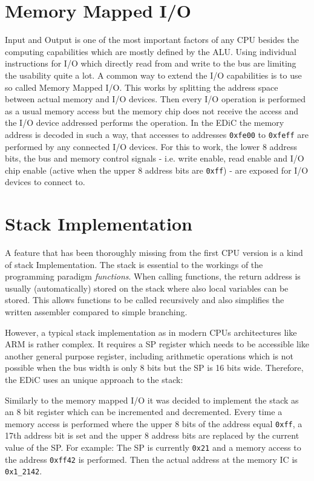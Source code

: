\section{Memory Mapped I/O}
Input and Output is one of the most important factors of any \gls{CPU} besides the computing capabilities which are mostly defined by the \gls{ALU}.
Using individual instructions for I/O which directly read from and write to the bus are limiting the usability quite a lot.
A common way to extend the I/O capabilities is to use so called Memory Mapped I/O.
This works by splitting the address space between actual memory and I/O devices.
Then every I/O operation is performed as a usual memory access but the memory chip does not receive the access and the I/O device addressed performs the operation.
In the \gls{EDiC} the memory address is decoded in such a way, that accesses to addresses \texttt{0xfe00} to \texttt{0xfeff} are performed by any connected I/O devices.
For this to work, the lower 8 address bits, the bus and memory control signals - i.e. write enable, read enable and I/O chip enable (active when the upper 8 address bits are \texttt{0xff}) - are exposed for I/O devices to connect to.
\section{Stack Implementation}
A feature that has been thoroughly missing from the first \gls{CPU} version is a kind of stack Implementation.
The stack is essential to the workings of the programming paradigm \emph{functions}.
When calling functions, the return address is usually (automatically) stored on the stack where also local variables can be stored.
This allows functions to be called recursively and also simplifies the written assembler compared to simple branching.

However, a typical stack implementation as in modern \glspl{CPU} architectures like ARM is rather complex.
It requires a \gls{SP} register which needs to be accessible like another general purpose register, including arithmetic operations which is not possible when the bus width is only 8 bits but the \gls{SP} is 16 bits wide.
Therefore, the \gls{EDiC} uses an unique approach to the stack:

Similarly to the memory mapped I/O it was decided to implement the stack as an 8 bit register which can be incremented and decremented.
Every time a memory access is performed where the upper 8 bits of the address equal \texttt{0xff}, a 17th address bit is set and the upper 8 address bits are replaced by the current value of the \gls{SP}.
For example: The \gls{SP}  is currently \texttt{0x21} and a memory access to the address \texttt{0xff42} is performed.
Then the actual address at the memory \gls{IC} is \texttt{0x1\_2142}.

